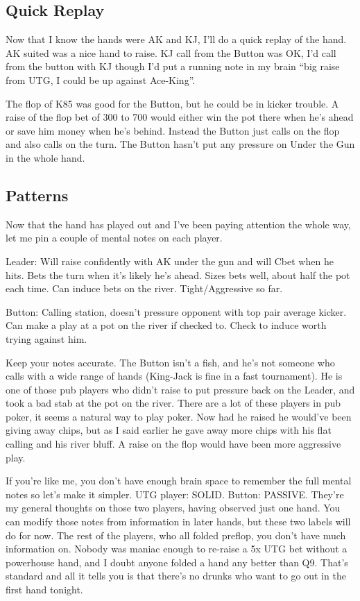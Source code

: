 \subsection*{Quick Replay}

Now that I know the hands were AK and KJ, I'll do a quick replay
of the hand. AK suited was a nice hand to raise. KJ call from the
Button was OK, I'd call from the button with KJ though I'd put
a running note in my brain ``big raise from UTG, I could be up
against Ace-King''.

The flop of K85 was good for the Button, but he could be in kicker
trouble. A raise of the flop bet of 300 to 700 would either win the
pot there when he's ahead or save him money when he's behind. Instead
the Button just calls on the flop and also calls on the turn. The
Button hasn't put any pressure on Under the Gun in the whole hand.

\subsection*{Patterns}

Now that the hand has played out and I've been paying attention the whole
way, let me pin a couple of mental notes on each player.

Leader: Will raise confidently with AK under the gun and will Cbet when
he hits. Bets the turn when it's likely he's ahead. Sizes bets well, about
half the pot each time. Can induce bets on the river. Tight/Aggressive so far.

Button: Calling station, doesn't pressure opponent with top pair
average kicker. Can make a play at a pot on the river if checked to.
Check to induce worth trying against him.

Keep your notes accurate. The Button isn't a fish,
and he's not someone who calls with a wide range of hands (King-Jack
is fine in a fast tournament). He is one of those
pub players who didn't raise to put pressure back on the Leader, and
took a bad stab at the pot on the river. There are a lot of these
players in pub poker, it seems a natural way to play poker. Now had he
raised he would've been giving away chips, but as I said earlier he
gave away more chips with his flat calling and his river bluff. A
raise on the flop would have been more aggressive play.

If you're like me, you don't have enough brain space to remember the
full mental notes so let's make it simpler. UTG player: SOLID.
Button: PASSIVE. They're my general thoughts on those two players,
having observed just one hand. You can modify those notes from
information in later hands, but these two labels will do for now. The
rest of the players, who all folded preflop, you don't have much
information on. Nobody was maniac enough to re-raise a 5x UTG bet
without a powerhouse hand, and I doubt anyone folded a hand any better
than Q9. That's standard and all it tells you is that there's no
drunks who want to go out in the first hand tonight.

